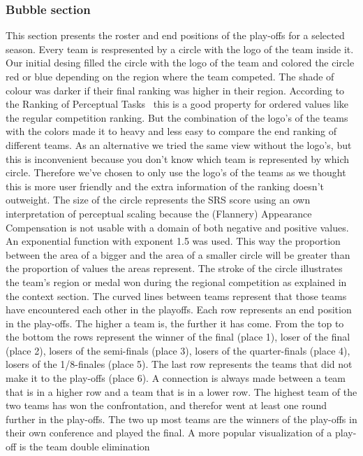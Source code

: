 \documentclass{sigchi}
\begin{document}
\subsubsection{Bubble section}
This section presents the roster and end positions of the play-offs for a
selected season. Every team is respresented by a circle with the logo of the
team inside it. Our initial desing filled the circle with the logo of the team
and colored the circle red or blue depending on the region where the team
competed. The shade of colour was darker if their final ranking was higher in
their region. According to the Ranking of Perceptual
Tasks~\cite{perceptualranking} this is a good property for ordered values like
the regular competition ranking. But the combination of the logo's of the teams
with the colors made it to heavy and less easy to compare the end ranking of
different teams. As an alternative we tried the same view without the logo's,
but this is inconvenient because you don't know which team is represented by
which circle. Therefore we've chosen to only use the logo's of the teams as we
thought this is more user friendly and the extra information of the ranking
doesn't outweight. The size of the circle represents the SRS score using an own
interpretation of perceptual scaling because the (Flannery) Appearance
Compensation is not usable with a domain of both negative and positive values.
An exponential function with exponent 1.5 was used. This way the proportion
between the area of a bigger and the area of a smaller circle will be greater
than the proportion of values the areas represent. The stroke of the circle
illustrates the team's region or medal won during the regional competition as
explained in the context section. The curved lines between teams represent that
those teams have encountered each other in the playoffs. Each row represents an
end position in the play-offs. The higher a team is, the further it has come.
From the top to the bottom the rows represent the winner of the final (place
1), loser of the final (place 2), losers of the semi-finals (place 3), losers
of the quarter-finals (place 4), losers of the 1/8-finales (place 5). The last
row represents the teams that did not make it to the play-offs (place 6).  A
connection is always made between a team that is in a higher row and a team
that is in a lower row. The highest team of the two teams has won the
confrontation, and therefor went at least one round further in the play-offs.
The two up most teams are the winners of the play-offs in their own conference
and played the final. 
A more popular visualization of a play-off is the team double elimination
\end{document}
